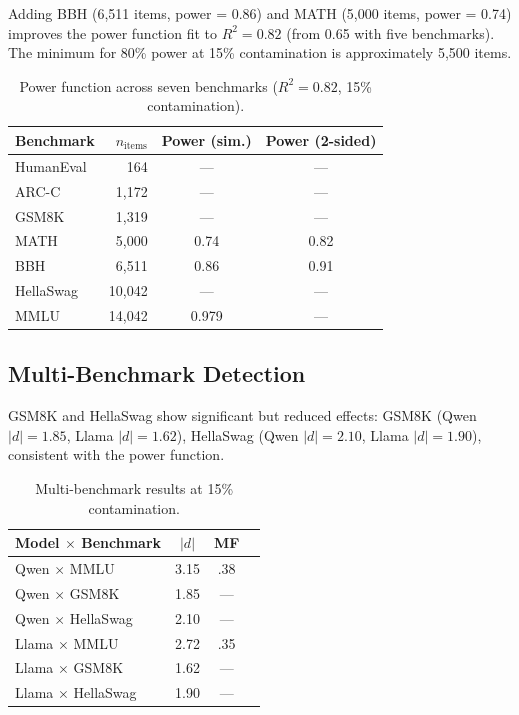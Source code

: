 \documentclass[11pt,a4paper]{article}
\begin{document}
Adding BBH (6,511 items, power = 0.86) and MATH (5,000 items, power = 0.74) improves the power function fit to $R^2 = 0.82$ (from 0.65 with five benchmarks).
The minimum for 80\% power at 15\% contamination is approximately 5,500 items.

\begin{table}[h]
\centering
\small
\begin{tabular}{lrcc}
\toprule
Benchmark & $n_{\text{items}}$ & Power (sim.) & Power (2-sided) \\
\midrule
HumanEval & 164 & --- & --- \\
ARC-C & 1,172 & --- & --- \\
GSM8K & 1,319 & --- & --- \\
MATH & 5,000 & 0.74 & 0.82 \\
BBH & 6,511 & 0.86 & 0.91 \\
HellaSwag & 10,042 & --- & --- \\
MMLU & 14,042 & 0.979 & --- \\
\bottomrule
\end{tabular}
\caption{Power function across seven benchmarks ($R^2 = 0.82$, 15\% contamination).}
\label{tab:power_function}
\end{table}

\subsection{Multi-Benchmark Detection}

GSM8K and HellaSwag show significant but reduced effects: GSM8K (Qwen $|d| = 1.85$, Llama $|d| = 1.62$), HellaSwag (Qwen $|d| = 2.10$, Llama $|d| = 1.90$), consistent with the power function.

\begin{table}[h]
\centering
\small
\begin{tabular}{lccc}
\toprule
Model $\times$ Benchmark & $|d|$ & MF \\
\midrule
Qwen $\times$ MMLU & 3.15 & .38 \\
Qwen $\times$ GSM8K & 1.85 & --- \\
Qwen $\times$ HellaSwag & 2.10 & --- \\
Llama $\times$ MMLU & 2.72 & .35 \\
Llama $\times$ GSM8K & 1.62 & --- \\
Llama $\times$ HellaSwag & 1.90 & --- \\
\bottomrule
\end{tabular}
\caption{Multi-benchmark results at 15\% contamination.}
\label{tab:multi_bench}
\end{table}
\end{document}
